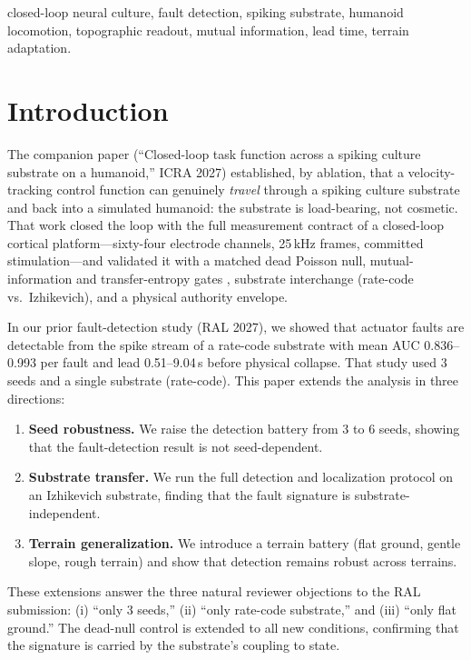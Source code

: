 \begin{IEEEkeywords}
closed-loop neural culture, fault detection, spiking substrate, humanoid
locomotion, topographic readout, mutual information, lead time, terrain adaptation.
\end{IEEEkeywords}

\section{Introduction}

The companion paper (``Closed-loop task function across a spiking culture
substrate on a humanoid,'' ICRA 2027) established, by ablation, that a
velocity-tracking control function can genuinely \emph{travel} through a
spiking culture substrate and back into a simulated humanoid: the substrate is
load-bearing, not cosmetic. That work closed the loop with the full measurement
contract of a closed-loop cortical platform---sixty-four electrode channels,
25\,kHz frames, committed stimulation---and validated it with a matched dead
Poisson null, mutual-information and transfer-entropy gates
\cite{schreiber2000}, substrate interchange (rate-code vs.\ Izhikevich), and a
physical authority envelope.

In our prior fault-detection study (RAL 2027), we showed that actuator faults
are detectable from the spike stream of a rate-code substrate with mean AUC
0.836--0.993 per fault and lead 0.51--9.04\,s before physical collapse. That
study used 3 seeds and a single substrate (rate-code). This paper extends the
analysis in
three directions:

\begin{enumerate}
\item \textbf{Seed robustness.} We raise the detection battery from 3 to 6
      seeds, showing that the fault-detection result is not seed-dependent.
\item \textbf{Substrate transfer.} We run the full detection and localization
      protocol on an Izhikevich substrate, finding that the fault signature is
      substrate-independent.
\item \textbf{Terrain generalization.} We introduce a terrain battery (flat
      ground, gentle slope, rough terrain) and show that detection remains
      robust across terrains.
\end{enumerate}

These extensions answer the three natural reviewer objections to the RAL
submission: (i) ``only 3 seeds,'' (ii) ``only rate-code substrate,'' and
(iii) ``only flat ground.'' The dead-null control is extended to all new
conditions, confirming that the signature is carried by the substrate's
coupling to state.

